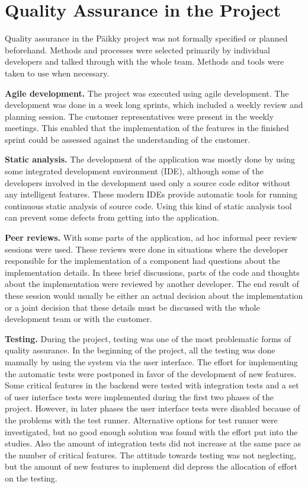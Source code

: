 
 \section{Quality Assurance in the Project}

Quality assurance in the Päikky project was not formally specified or planned beforehand. Methods and processes were selected primarily by individual developers and talked through with the whole team. Methods and tools were taken to use when necessary.

\textbf{Agile development.} The project was executed using agile development. The development was done in a week long sprints, which included a weekly review and planning session. The customer representatives were present in the weekly meetings. This enabled that the implementation of the features in the finished sprint could be assessed against the understanding of the customer. 

\textbf{Static analysis.} The development of the application was mostly done by using some integrated development environment (IDE), although some of the developers involved in the development used only a source code editor without any intelligent features. These modern IDEs provide automatic tools for running continuous static analysis of source code. Using this kind of static analysis tool can prevent some defects from getting into the application. 

\textbf{Peer reviews.} With some parts of the application, ad hoc informal peer review sessions were used. These reviews were done in situations where the developer responsible for the implementation of a component had questions about the implementation details. In these brief discussions, parts of the code and thoughts about the implementation were reviewed by another developer. The end result of these session would usually be either an actual decision about the implementation or a joint decision that these details must be discussed with the whole development team or with the customer.

\textbf{Testing.} During the project, testing was one of the most problematic forms of quality assurance. In the beginning of the project, all the testing was done manually by using the system via the user interface. The effort for implementing the automatic tests were postponed in favor of the development of new features. Some critical features in the backend were tested with integration tests and a set of user interface tests were implemented during the first two phases of the project. However, in later phases the user interface tests were disabled because of the problems with the test runner. Alternative options for test runner were investigated, but no good enough solution was found with the effort put into the studies. Also the amount of integration tests did not increase at the same pace as the number of critical features. The attitude towards testing was not neglecting, but the amount of new features to implement did depress the allocation of effort on the testing.

